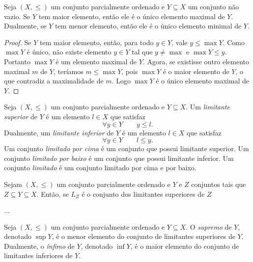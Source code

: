 \begin{proposition}
	Seja $(X,\leq)$ um conjunto parcialmente ordenado e $Y \subseteq X$ um conjunto não vazio. Se $Y$ tem maior elemento, então ele é o único elemento maximal de $Y$. Dualmente, se $Y$ tem menor elemento, então ele é o único elemento minimal de $Y$.
\end{proposition}
\begin{proof}
	Se $Y$ tem maior elemento, então, para todo $y \in Y$, vale $y \leq \max Y$. Como $\max Y$ é único, não existe elemento $y \in Y$ tal que $y \neq \max$ e $\max Y \leq y$. Portanto $\max Y$ é um elemento maximal de $Y$. Agora, se existisse outro elemento maximal $m$ de $Y$, teríamos $m \leq \max Y$, pois $\max Y$ é o maior elemento de $Y$, o que contradiz a maximalidade de $m$. Logo $\max Y$ é o único elemento maximal de $Y$.
\end{proof}

\begin{definition}
	Seja $(X,\leq)$ um conjunto parcialmente ordenado e $Y \subseteq X$. Um \emph{limitante superior} de $Y$ é um elemento $l \in X$ que satisfaz
	\begin{equation*}
	\forall y \in Y \qquad y \leq l.
	\end{equation*}
Dualmente, um \emph{limitante inferior} de $Y$ é um elemento $l \in X$ que satisfaz
	\begin{equation*}
	\forall y \in Y \qquad l \leq y.
	\end{equation*}
Um conjunto \emph{limitado por cima} é um  conjunto que possui limitante superior. Um conjunto \emph{limitado por baixo} é um conjunto que possui limitante inferior. Um conjunto \emph{limitado} é um conjunto limitado por cima e por baixo.
\end{definition}

\begin{proposition}
	Sejam $(X,\leq)$ um conjunto parcialmente ordenado e $Y$ e $Z$ conjuntos tais que $Z \subseteq Y \subseteq X$. Então, se $L_Z$ é o conjunto dos limitantes superiores de $Z$
	
	...
\end{proposition}

\begin{definition}
	Seja $(X,\leq)$ um conjunto parcialmente ordenado e $Y \subseteq X$. O \emph{supremo} de $Y$, denotado $\sup Y$, é o menor elemento do conjunto de limitantes superiores de $Y$. Dualmente, o \emph{ínfimo} de $Y$, denotado $\inf Y$, é o maior elemento do conjunto de limitantes inferiores de $Y$.
\end{definition}

